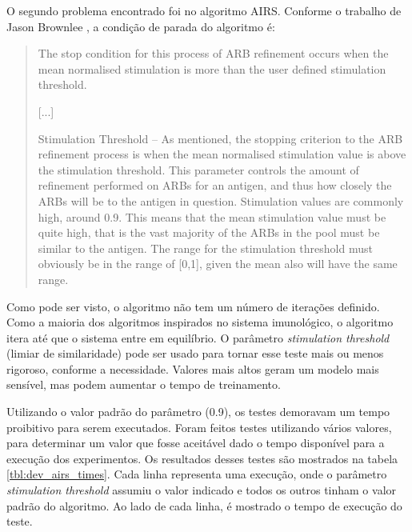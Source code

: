 O segundo problema encontrado foi no algoritmo AIRS. Conforme o trabalho de Jason Brownlee \cite{Brownlee2005}, a condição de parada do algoritmo é:

\begin{quote}
The stop condition for this process of ARB refinement occurs when the
mean normalised stimulation is more than the user defined stimulation
threshold.

[...]

Stimulation Threshold – As mentioned, the stopping criterion to the ARB
refinement process is when the mean normalised stimulation value is above
the stimulation threshold. This parameter controls the amount of refinement
performed on ARBs for an antigen, and thus how closely the ARBs will be
to the antigen in question. Stimulation values are commonly high, around
0.9. This means that the mean stimulation value must be quite high, that is
the vast majority of the ARBs in the pool must be similar to the antigen.
The range for the stimulation threshold must obviously be in the range of
[0,1], given the mean also will have the same range.
\end{quote}

Como pode ser visto, o algoritmo não tem um número de iterações definido. Como a maioria dos algoritmos inspirados no sistema imunológico, o algoritmo itera até que o sistema entre em equilíbrio. O parâmetro \emph{stimulation threshold} (limiar de similaridade) pode ser usado para tornar esse teste mais ou menos rigoroso, conforme a necessidade. Valores mais altos geram um modelo mais sensível, mas podem aumentar o tempo de treinamento.

Utilizando o valor padrão do parâmetro (0.9), os testes demoravam um tempo proibitivo para serem executados. Foram feitos testes utilizando vários valores, para determinar um valor que fosse aceitável dado o tempo disponível para a execução dos experimentos. Os resultados desses testes são mostrados na tabela \ref{tbl:dev_airs_times}. Cada linha representa uma execução, onde o parâmetro \emph{stimulation threshold} assumiu o valor indicado e todos os outros tinham o valor padrão do algoritmo. Ao lado de cada linha, é mostrado o tempo de execução do teste.

